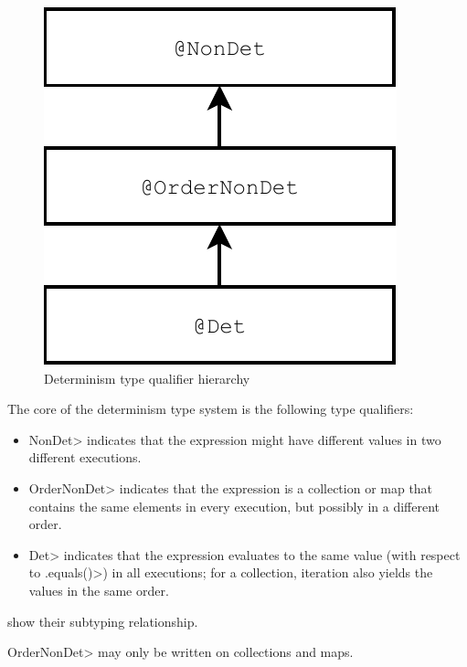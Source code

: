 \begin{figure}
    \begin{center}
        \includegraphics[scale=0.5]{determinism}
    \end{center}
    \caption{Determinism type qualifier hierarchy}
    \label{fig:determinism-hierarchy}
\end{figure}

The core of the determinism type system is the following type qualifiers:
\begin{itemize}
    \item \<NonDet> indicates
    that the expression might have different values in two different executions.
    \item \<OrderNonDet> indicates that the expression is a collection or
      map that contains the same elements in every execution, but possibly
      in a different order.
    \item \<Det> indicates that
    the expression evaluates to the same value (with respect to \<.equals()>) in all
    executions; for a collection, iteration also yields the values in the same
    order.
\end{itemize}
 show their subtyping relationship.

\<OrderNonDet> may only be written on collections and maps.

